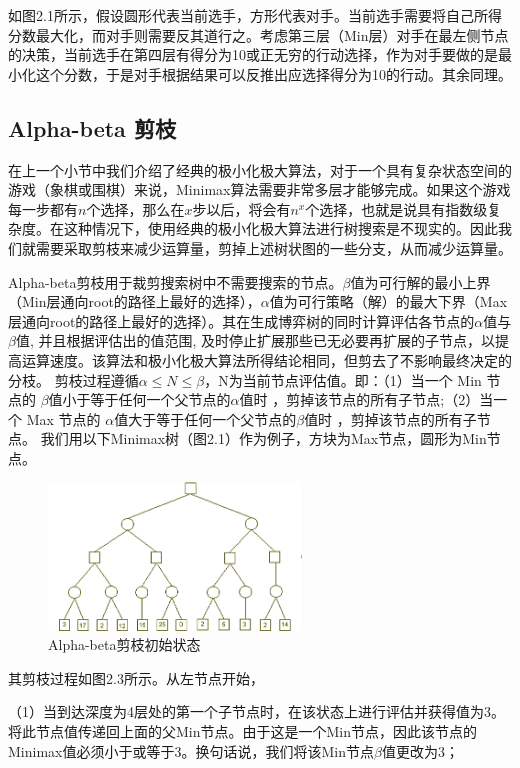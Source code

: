 如图2.1所示，假设圆形代表当前选手，方形代表对手。当前选手需要将自己所得分数最大化，而对手则需要反其道行之。考虑第三层（Min层）对手在最左侧节点的决策，当前选手在第四层有得分为10或正无穷的行动选择，作为对手要做的是最小化这个分数，于是对手根据结果可以反推出应选择得分为10的行动。其余同理。
\subsection{Alpha-beta 剪枝}
在上一个小节中我们介绍了经典的极小化极大算法，对于一个具有复杂状态空间的游戏（象棋或围棋）来说，Minimax算法需要非常多层才能够完成。如果这个游戏每一步都有$n$个选择，那么在$x$步以后，将会有$n^x$个选择，也就是说具有指数级复杂度。在这种情况下，使用经典的极小化极大算法进行树搜索是不现实的。因此我们就需要采取剪枝来减少运算量，剪掉上述树状图的一些分支，从而减少运算量。

Alpha-beta剪枝用于裁剪搜索树中不需要搜索的节点。$\beta$值为可行解的最小上界（Min层通向root的路径上最好的选择），$\alpha$值为可行策略（解）的最大下界（Max层通向root的路径上最好的选择）。其在生成博弈树的同时计算评估各节点的$\alpha$值与$\beta$值, 并且根据评估出的值范围, 及时停止扩展那些已无必要再扩展的子节点，以提高运算速度。该算法和极小化极大算法所得结论相同，但剪去了不影响最终决定的分枝\cite{russell2010artificial}。
剪枝过程遵循$\alpha \le N \le \beta$，N为当前节点评估值。即：（1）当一个 Min 节点的 $\beta$值小于等于任何一个父节点的$\alpha$值时 ，剪掉该节点的所有子节点;（2）当一个 Max 节点的 $\alpha$值大于等于任何一个父节点的$\beta$值时 ，剪掉该节点的所有子节点。
我们用以下Minimax树（图2.1）作为例子，方块为Max节点，圆形为Min节点\cite{russell2010artificial}。
\begin{figure}[htb]
    \centering
    \includegraphics[width=0.6\textwidth]{abp1.PNG}
    \caption[abp]{%
    Alpha-beta剪枝初始状态\cite{russell2010artificial}%
      }
    \label{fig:abp}
  \end{figure}

其剪枝过程如图2.3所示。从左节点开始，

（1）当到达深度为4层处的第一个子节点时，在该状态上进行评估并获得值为3。将此节点值传递回上面的父Min节点。由于这是一个Min节点，因此该节点的Minimax值必须小于或等于3。换句话说，我们将该Min节点$\beta$值更改为3；

